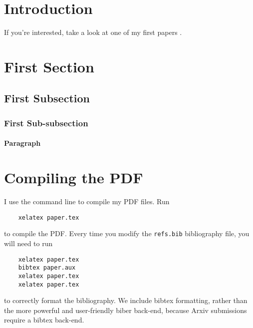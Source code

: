 


%
%

\section{Introduction}

If you're interested, take a look at one of my first papers \cite{sahu-mandadapu-pre-2017}.
\lipsum[2]



%
%

\section{First Section} \label{sec:first_section}

\lipsum[3]



%
%

\subsection{First Subsection}

\lipsum[4]



%
%

\subsubsection{First Sub-subsection}

\lipsum[5]



%
%

\paragraph{Paragraph}

\lipsum[6]



%
%

\section{Compiling the PDF}

I use the command line to compile my PDF files.
Run
\begin{verbatim}
	xelatex paper.tex
\end{verbatim}
to compile the PDF.
Every time you modify the \verb+refs.bib+ bibliography file, you will need to run
\begin{verbatim}
	xelatex paper.tex
	bibtex paper.aux
	xelatex paper.tex
	xelatex paper.tex
\end{verbatim}
to correctly format the bibliography.
We include bibtex formatting, rather than the more powerful and user-friendly biber back-end, because Arxiv submissions require a bibtex back-end.



